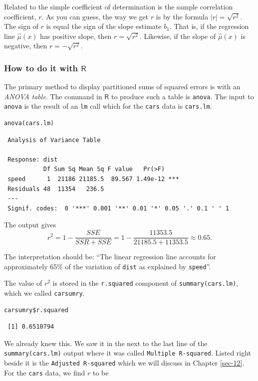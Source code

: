 \documentclass[captions=tableheading]{scrbook}
\begin{document}
Related to the simple coefficient of determination is the sample correlation coefficient, \(r\). As you can guess, the way we get \(r\) is by the formula \(|r|=\sqrt{r^{2}}\). The sign of \(r\) is equal the sign of the slope estimate \(b_{1}\). That is, if the regression line \(\hat{\mu}(x)\) has positive slope, then \(r=\sqrt{r^{2}}\). Likewise, if the slope of \(\hat{\mu}(x)\) is negative, then \(r=-\sqrt{r^{2}}\).
\subsubsection{How to do it with \(\mathsf{R}\)}
\label{sec-11-3-2-1}


The primary method to display partitioned sums of squared errors is with an \emph{ANOVA table}. The command in \(\mathsf{R}\) to produce such a table is \texttt{anova}. The input to \texttt{anova} is the result of an \texttt{lm} call which for the \texttt{cars} data is \texttt{cars.lm}.


\lstset{language=R}
\begin{lstlisting}
anova(cars.lm)
\end{lstlisting}

\begin{verbatim}
 Analysis of Variance Table
 
 Response: dist
           Df Sum Sq Mean Sq F value   Pr(>F)    
 speed      1  21186 21185.5  89.567 1.49e-12 ***
 Residuals 48  11354   236.5                     
 ---
 Signif. codes:  0 '***' 0.001 '**' 0.01 '*' 0.05 '.' 0.1 ' ' 1
\end{verbatim}

The output gives
\[
r^{2}=1-\frac{SSE}{SSR+SSE}=1-\frac{11353.5}{21185.5+11353.5}\approx0.65.
\]

The interpretation should be: ``The linear regression line accounts for approximately 65\% of the variation of \texttt{dist} as explained by \texttt{speed}''.

The value of \(r^{2}\) is stored in the \texttt{r.squared} component of \texttt{summary(cars.lm)}, which we called \texttt{carsumry}.


\lstset{language=R}
\begin{lstlisting}
carsumry$r.squared
\end{lstlisting}

\begin{verbatim}
 [1] 0.6510794
\end{verbatim}

We already knew this. We saw it in the next to the last line of the \texttt{summary(cars.lm)} output where it was called \texttt{Multiple R-squared}. Listed right beside it is the \texttt{Adjusted R-squared} which we will discuss in Chapter \ref{sec-12}.  For the \texttt{cars} data, we find \(r\) to be
\end{document}
